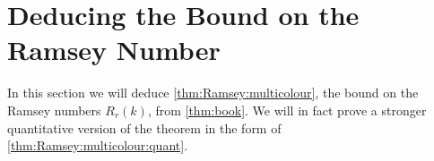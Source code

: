 
\section{Deducing the Bound on the Ramsey Number}

In this section we will deduce \autoref{thm:Ramsey:multicolour}, the bound on the Ramsey numbers \(R_r(k)\), from \autoref{thm:book}.
We will in fact prove a stronger quantitative version of the theorem in the form of \autoref{thm:Ramsey:multicolour:quant}.


